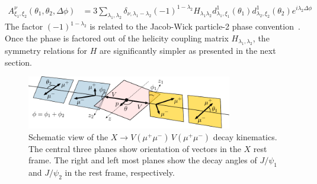 \documentclass[prd,preprintnumbers,floatfix,
nofootinbib,superscriptaddress]{revtex4}
\begin{document}
\begin{align} \label{eq:decay.A}
  A^{\nu}_{\xi_1,\xi_2}(\theta_1,\theta_2,\Delta\phi) &= 3
  \sum_{\lambda_1,\lambda_2}
  \delta_{\nu,\lambda_1-\lambda_2} (-1)^{1-\lambda_2}
  H_{\lambda_1\lambda_2}
  d_{\lambda_1,\xi_1}^{1}(\theta_1) d_{\lambda_2,\xi_2}^{1}(\theta_2)
  e^{i\lambda_2 \Delta\phi}
\end{align}
The factor $(-1)^{1-\lambda_2}$ is related to the Jacob-Wick particle-2 phase convention~\cite{Jacob:1959at}.
Once the phase is factored out of the helicity coupling matrix $H_{\lambda_1,\lambda_2}$,
the symmetry relations for $H$ are significantly simpler as presented in the next section.
\begin{figure}
  \includegraphics[width=0.8\textwidth]{../plots/angles.pdf}
  \caption{Schematic view of the $X\to V(\mu^+\mu^-)\,V(\mu^+\mu^-)$ decay kinematics.
  The central three planes show orientation of vectors in the $X$ rest frame.
  The right and left most planes show the decay angles of $J/\psi_1$ and $J/\psi_2$ in the rest frame, respectively.
  }
  \label{fig:decay}
\end{figure}


\end{document}

